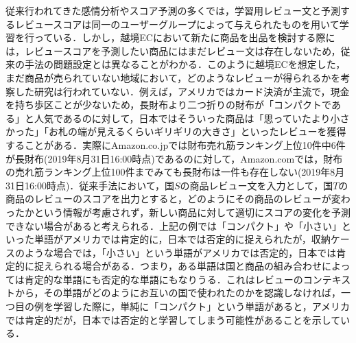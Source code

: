 \documentclass[dvipdfmx,twocolumn,10.5pt]{jsarticle}
\begin{document}
従来行われてきた感情分析やスコア予測の多くでは，学習用レビュー文と予測するレビュースコアは同一のユーザーグループによって与えられたものを用いて学習を行っている．しかし，越境ECにおいて新たに商品を出品を検討する際には，レビュースコアを予測したい商品にはまだレビュー文は存在しないため，従来の手法の問題設定とは異なることがわかる．このように越境ECを想定した，まだ商品が売られていない地域において，どのようなレビューが得られるかを考察した研究は行われていない．例えば，アメリカではカード決済が主流で，現金を持ち歩区ことが少ないため，長財布より二つ折りの財布が「コンパクトである」と人気であるのに対して，日本ではそういった商品は「思っていたより小さかった」「お札の端が見えるくらいギリギリの大きさ」といったレビューを獲得することがある．実際にAmazon.co.jpでは財布売れ筋ランキング上位10件中6件が長財布(2019年8月31日16:00時点)であるのに対して，Amazon.comでは，財布の売れ筋ランキング上位100件までみても長財布は一件も存在しない(2019年8月31日16:00時点)．従来手法において，国$S$の商品レビュー文を入力として，国$T$の商品のレビューのスコアを出力とすると，どのようにその商品のレビューが変わったかという情報が考慮されず，新しい商品に対して適切にスコアの変化を予測できない場合があると考えられる．上記の例では「コンパクト」や「小さい」といった単語がアメリカでは肯定的に，日本では否定的に捉えられたが，収納ケースのような場合では，「小さい」という単語がアメリカでは否定的，日本では肯定的に捉えられる場合がある．つまり，ある単語は国と商品の組み合わせによっては肯定的な単語にも否定的な単語にもなりうる．これはレビューのコンテキストから，その単語がどのようにお互いの国で使われたのかを認識しなければ，一つ目の例を学習した際に，単純に「コンパクト」という単語があると，アメリカでは肯定的だが，日本では否定的と学習してしまう可能性があることを示している．
\end{document}
